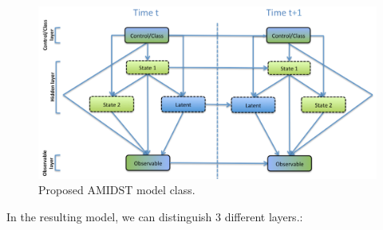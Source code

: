 \begin{figure}[ht!]
\begin{center}
\includegraphics[scale=0.465]{./figures/AMIDSTModelClass}
\caption{\label{Figure:AMIDSTModelClass} Proposed AMIDST model class.}
\end{center}
\end{figure}


In the resulting model, we can distinguish 3 different layers.:

